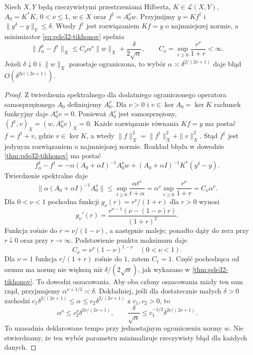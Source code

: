 \begin{twierdzenie}
\label{thm:pde32-fractional-source}
Niech $X,Y$ będą rzeczywistymi przestrzeniami Hilberta,
$K\in\mathcal L(X,Y)$, $A_0=K^*K$,
$0<\nu\le1$, $w\in X$ oraz
$f^\dagger=A_0^\nu w$. Przyjmijmy
$y=Kf^\dagger$ i $\|y^\delta-y\|_Y\le\delta$.
Wtedy $f^\dagger$ jest rozwiązaniem $Kf=y$
o najmniejszej normie, a minimizator
\eqref{eq:pde32-tikhonov} spełnia
\begin{equation}\label{eq:pde32-fractional-rate}
 \|f_\alpha^\delta-f^\dagger\|_X
 \le C_\nu\alpha^\nu\|w\|_X+
 \frac{\delta}{2\sqrt\alpha},\qquad
 C_\nu=\sup_{r\ge0}\frac{r^\nu}{1+r}<\infty.
\end{equation}
Jeżeli $\delta\downarrow0$ i $\|w\|_X$ pozostaje
ograniczona, to wybór
$\alpha\asymp\delta^{2/(2\nu+1)}$
daje błąd $O(\delta^{2\nu/(2\nu+1)})$.
\end{twierdzenie}
\begin{proof}
Z twierdzenia spektralnego dla dodatniego ograniczonego
operatora samosprzężonego $A_0$ definiujemy
$A_0^\nu$. Dla $\nu>0$ i $v\in\ker A_0=\ker K$
rachunek funkcyjny daje $A_0^\nu v=0$.
Ponieważ $A_0^\nu$ jest samosprzężony,
$(f^\dagger,v)_X=(w,A_0^\nu v)_X=0$.
Każde rozwiązanie równania $Kf=y$ ma postać
$f=f^\dagger+v$, gdzie $v\in\ker K$, a wtedy
$\|f\|_X^2=\|f^\dagger\|_X^2+\|v\|_X^2$.
Stąd $f^\dagger$ jest jedynym rozwiązaniem
o najmniejszej normie.
Rozkład błędu w dowodzie
\ref{thm:pde32-tikhonov} ma postać
\[
 f_\alpha^\delta-f^\dagger
 =-\alpha(A_0+\alpha I)^{-1}A_0^\nu w
 +(A_0+\alpha I)^{-1}K^*(y^\delta-y).
\]
Twierdzenie spektralne daje
\[
 \|\alpha(A_0+\alpha I)^{-1}A_0^\nu\|
 \le\sup_{t\ge0}\frac{\alpha t^\nu}{t+\alpha}
 =\alpha^\nu\sup_{r\ge0}\frac{r^\nu}{1+r}
 =C_\nu\alpha^\nu.
\]
Dla $0<\nu<1$ pochodna funkcji
$g_\nu(r)=r^\nu/(1+r)$ dla $r>0$ wynosi
\[
 g_\nu'(r)=
 \frac{r^{\nu-1}(\nu-(1-\nu)r)}{(1+r)^2}.
\]
Funkcja rośnie do $r=\nu/(1-\nu)$, a następnie
maleje; ponadto dąży do zera przy $r\downarrow0$
oraz przy $r\to\infty$.
Podstawienie punktu maksimum daje
\[
 C_\nu=\nu^\nu(1-\nu)^{1-\nu}
 \quad(0<\nu<1).
\]
Dla $\nu=1$ funkcja $r/(1+r)$ rośnie do $1$,
zatem $C_1=1$.
Część pochodząca od szumu ma normę nie większą
niż $\delta/(2\sqrt\alpha)$, jak wykazano w
\ref{thm:pde32-tikhonov}. To dowodzi oszacowania.
Aby oba człony oszacowania miały ten sam rząd,
przyjmujemy $\alpha^{\nu+1/2}\asymp\delta$.
Dokładniej, jeśli dla dostatecznie małych $\delta>0$
zachodzi $c_1\delta^{2/(2\nu+1)}\le\alpha
\le c_2\delta^{2/(2\nu+1)}$ z $c_1,c_2>0$, to
\[
 \alpha^\nu\le c_2^\nu\delta^{2\nu/(2\nu+1)},
 \qquad
 \frac{\delta}{\sqrt\alpha}\le
 c_1^{-1/2}\delta^{2\nu/(2\nu+1)}.
\]
To uzasadnia deklarowane tempo przy jednostajnym
ograniczeniu normy $w$. Nie stwierdzamy, że ten wybór
parametru minimalizuje rzeczywisty błąd dla każdych danych.
\end{proof}


